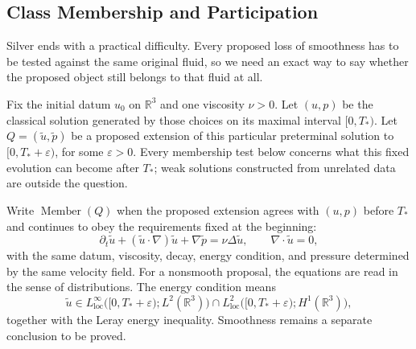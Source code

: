 \subsection{Class Membership and Participation}\label{sub:ClassMembershipAndParticipation}

Silver ends with a practical difficulty.
Every proposed loss of smoothness has to be tested against the same original fluid, so we need an exact way to say whether the proposed object still belongs to that fluid at all.

Fix the initial datum \(u_0\) on \(\mathbb R^3\) and one viscosity \(\nu>0\).
Let \((u,p)\) be the classical solution generated by those choices on its maximal interval \([0,T_*)\).
Let \(Q=(\widetilde u,\widetilde p)\) be a proposed extension of this particular preterminal solution to \([0,T_*+\varepsilon)\), for some \(\varepsilon>0\).
Every membership test below concerns what this fixed evolution can become after \(T_*\); weak solutions constructed from unrelated data are outside the question.

Write \(\operatorname{Member}(Q)\) when the proposed extension agrees with \((u,p)\) before \(T_*\) and continues to obey the requirements fixed at the beginning:
\[
  \partial_t\widetilde u
  +(\widetilde u\cdot\nabla)\widetilde u
  +\nabla\widetilde p
  =
  \nu\Delta\widetilde u,
  \qquad
  \nabla\cdot\widetilde u=0,
\]
with the same datum, viscosity, decay, energy condition, and pressure determined by the same velocity field.
For a nonsmooth proposal, the equations are read in the sense of distributions.
The energy condition means
\[
  \widetilde u
  \in
  L^\infty_{\mathrm{loc}}\bigl([0,T_*+\varepsilon);L^2(\mathbb R^3)\bigr)
  \cap
  L^2_{\mathrm{loc}}\bigl([0,T_*+\varepsilon);H^1(\mathbb R^3)\bigr),
\]
together with the Leray energy inequality.
Smoothness remains a separate conclusion to be proved.

